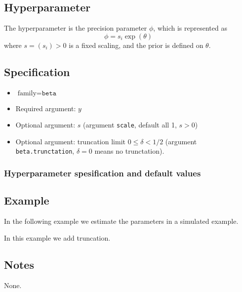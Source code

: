 \documentclass[a4paper,11pt]{article}
\begin{document}
\subsection*{Hyperparameter}

The hyperparameter is the precision parameter $\phi$, which is
represented as
\begin{displaymath}
    \phi = s_i \exp(\theta)
\end{displaymath}
where $s = (s_i) > 0$ is a fixed scaling, and the prior is defined on
$\theta$.

\subsection*{Specification}

\begin{itemize}
\item $\text{family}=\texttt{beta}$
\item Required argument: $y$
\item Optional argument: $s$ (argument \texttt{scale}, default all 1, $s>0$)
\item Optional argument: truncation limit $0 \le \delta < 1/2$
    (argument \texttt{beta.trunctation}, $\delta=0$ means no trunctation).
\end{itemize}

\subsubsection*{Hyperparameter spesification and default values}



\subsection*{Example}

In the following example we estimate the parameters in a simulated
example.


In this example we add truncation.


\subsection*{Notes}

None.
\end{document}
